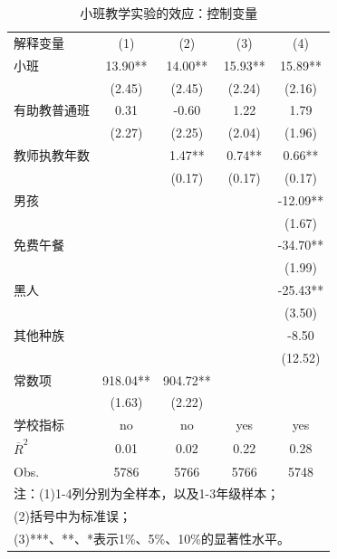 \documentclass[cn,10pt,math=newtx,citestyle=gb7714-2015,bibstyle=gb7714-2015]{elegantbook}
\begin{document}
	\begin{center}
		\begin{table}[!h]
			\caption{小班教学实验的效应：控制变量}\label{tab:digit}
			\begin{center}
				\begin{tabular}{lcccc}
					\hline
					解释变量&(1)&(2)&(3)&(4)\\
					\cline{1-5}
					小班&13.90**&14.00**&15.93**&15.89**\\
					&(2.45)&(2.45)&(2.24)&(2.16)\\
					
					有助教普通班&0.31&-0.60&1.22&1.79\\
					&(2.27)&(2.25)&(2.04)&(1.96)\\
					
					教师执教年数&&1.47**&0.74**&0.66**\\
					&&(0.17)&(0.17)&(0.17)\\
					
					男孩&&&&-12.09**\\
					&&&&(1.67)\\
					
					免费午餐&&&&-34.70**\\
					&&&&(1.99)\\
					
					黑人&&&&-25.43**\\
					&&&&(3.50)\\
					
					其他种族&&&&-8.50\\
					&&&&(12.52)\\
					
					常数项&918.04**&904.72**&&\\
					&(1.63)&(2.22)&&\\
					
					\cline{1-5}
					学校指标&no&no&yes&yes\\
					$\overline{R}^2$&0.01&0.02&0.22&0.28\\
					
					Obs.&5786&5766&5766&5748\\
					
					\cline{1-5}
					\multicolumn{5}{l}{注：(1)1-4列分别为全样本，以及1-3年级样本；}\\
					\multicolumn{5}{l}{(2)括号中为标准误；}\\
					\multicolumn{5}{l}{(3)***、**、*表示1\%、5\%、10\%的显著性水平。}\\
					\hline
				\end{tabular}
			\end{center}
		\end{table}
	\end{center}
	
\end{document}
